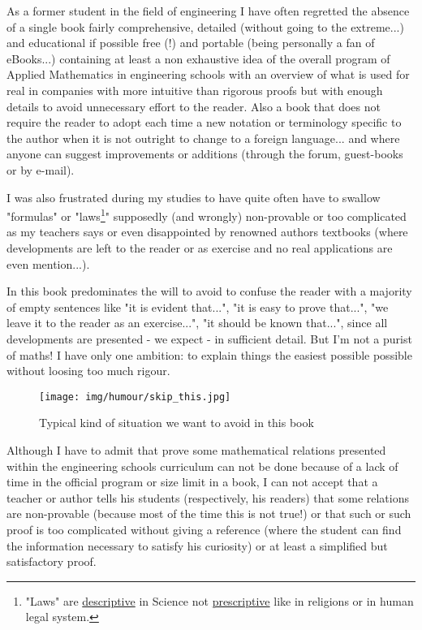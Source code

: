 	As a former student in the field of engineering I have often regretted the absence of a single book fairly comprehensive, detailed (without going to the extreme...) and educational if possible free (!) and portable (being personally a fan of eBooks...) containing at least a non exhaustive idea of the overall program of Applied Mathematics in engineering schools with an overview of what is used for real in companies with more intuitive than rigorous proofs but with enough details to avoid unnecessary effort to the reader. Also a book that does not require the reader to adopt each time a new notation or terminology specific to the author when it is not outright to change to a foreign language... and where anyone can suggest improvements or additions (through the forum, guest-books or by e-mail).

	I was also frustrated during my studies to have quite often have to swallow "formulas" or "laws\footnote{"Laws" are \underline{descriptive} in Science not \underline{prescriptive} like in religions or in human legal system.}" supposedly (and wrongly) non-provable or too complicated as my teachers says or even disappointed by renowned authors textbooks (where developments are left to the reader or as exercise and no real applications are even mention...). 
	
	In this book predominates the will to avoid to confuse the reader with a majority of empty sentences like "it is evident that...", "it is easy to prove that...", "we leave it to the reader as an exercise...", "it should be known that...", since all developments are presented - we expect - in sufficient detail. But I'm not a purist of maths! I have only one ambition: to explain things the easiest possible possible without loosing too much rigour.
	\begin{figure}[H]
		\centering
		\texttt{[image: img/humour/skip\_this.jpg]}
		\caption[]{Typical kind of situation we want to avoid in this book}
	\end{figure} 
	Although I have to admit that prove some mathematical relations presented within the engineering schools curriculum can not be done because of a lack of time in the official program or size limit in a book, I can not accept that a teacher or author tells his students (respectively, his readers) that some relations are non-provable (because most of the time this is not true!) or that such or such proof is too complicated without giving a reference (where the student can find the information necessary to satisfy his curiosity) or at least a simplified but satisfactory proof.

